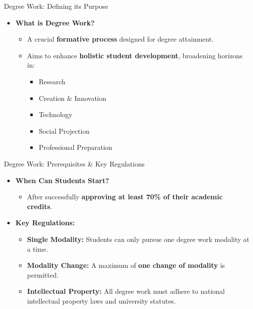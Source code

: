   \begin{frame}{Degree Work: Defining its Purpose}
    \begin{itemize}
      \item<1-> \textbf{What is Degree Work?}
        \begin{itemize}
          \item<2-> A crucial \textbf{formative process} designed for degree attainment.
          \item<3-> Aims to enhance \textbf{holistic student development}, broadening horizons in:
            \begin{itemize}
              \item<4-> Research
              \item<5-> Creation \& Innovation
              \item<6-> Technology
              \item<7-> Social Projection
              \item<8-> Professional Preparation
            \end{itemize}
        \end{itemize}
    \end{itemize}
  \end{frame}

    \begin{frame}{Degree Work: Prerequisites \& Key Regulations}
      \begin{itemize}
        \item<1-> \textbf{When Can Students Start?}
          \begin{itemize}
            \item<2-> After successfully \textbf{approving at least 70\% of their academic credits}.
          \end{itemize}
          \pause
        \item<3-> \textbf{Key Regulations:}
          \begin{itemize}
            \item<4-> \textbf{Single Modality:} Students can only pursue one degree work modality at a time.
            \item<5-> \textbf{Modality Change:} A maximum of \textbf{one change of modality} is permitted.
            \item<6-> \textbf{Intellectual Property:} All degree work must adhere to national intellectual property laws and university statutes.
          \end{itemize}
      \end{itemize}
    \end{frame}

